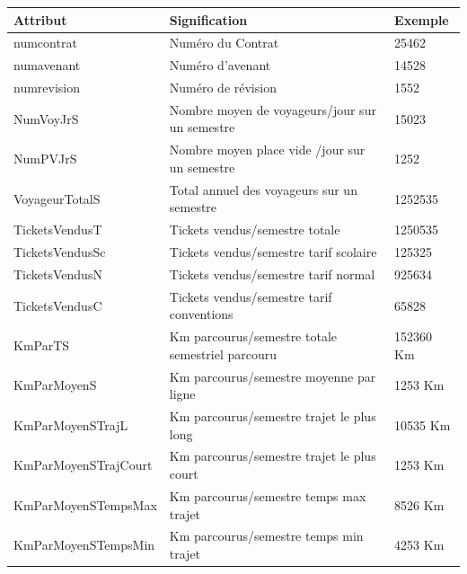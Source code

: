 \documentclass[a4paper]{report}
\begin{document}
\begin{doublespace}
	\begin{table}[H]
		\begin{center}
			\begin{tabularx}{17.5cm}{|p{4cm}|X|p{2cm}|}
				\hline
				\textbf{Attribut}    & \textbf{Signification}                           & \textbf{Exemple} \\
				\hline
				numcontrat           & Numéro du Contrat                                & 25462            \\
				\hline
				numavenant           & Numéro d'avenant                                 & 14528            \\
				\hline
				numrevision          & Numéro de révision                               & 1552             \\
				\hline
				NumVoyJrS            & Nombre moyen de voyageurs/jour  sur un semestre  & 15023            \\
				\hline
				NumPVJrS             & Nombre moyen place vide /jour  sur un semestre   & 1252             \\
				\hline
				VoyageurTotalS       & Total annuel des voyageurs  sur un semestre      & 1252535          \\
				\hline
				TicketsVendusT       & Tickets vendus/semestre totale                   & 1250535          \\
				\hline
				TicketsVendusSc      & Tickets vendus/semestre tarif scolaire           & 125325           \\
				\hline
				TicketsVendusN       & Tickets vendus/semestre tarif normal             & 925634           \\
				\hline
				TicketsVendusC       & Tickets vendus/semestre tarif conventions        & 65828            \\
				\hline
				KmParTS              & Km parcourus/semestre totale semestriel parcouru & 152360 Km        \\
				\hline
				KmParMoyenS          & Km parcourus/semestre moyenne par ligne          & 1253 Km          \\
				\hline
				KmParMoyenSTrajL     & Km parcourus/semestre trajet le plus long        & 10535 Km         \\
				\hline
				KmParMoyenSTrajCourt & Km parcourus/semestre trajet le plus court       & 1253 Km          \\
				\hline
				KmParMoyenSTempsMax  & Km parcourus/semestre temps max trajet           & 8526 Km          \\
				\hline
				KmParMoyenSTempsMin  & Km parcourus/semestre temps min trajet           & 4253 Km          \\

\end{tabularx}
\end{center}
\end{table}
\end{doublespace}
\end{document}
